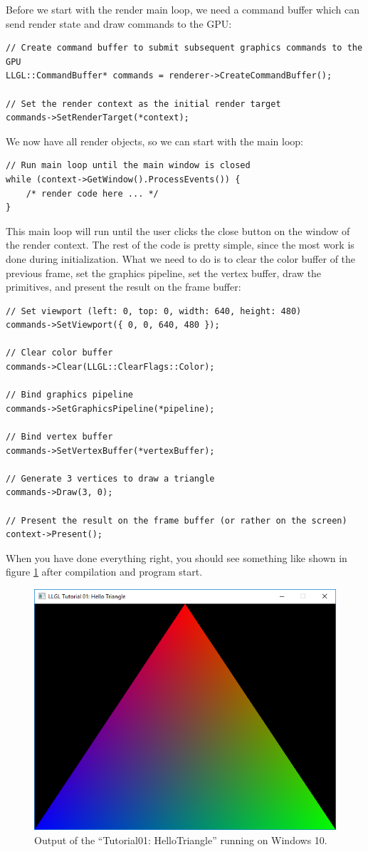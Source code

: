 \documentclass{article}
\begin{document}
Before we start with the render main loop, we need a command buffer which can send render state and draw commands to the GPU:
\begin{lstlisting}
// Create command buffer to submit subsequent graphics commands to the GPU
LLGL::CommandBuffer* commands = renderer->CreateCommandBuffer();

// Set the render context as the initial render target
commands->SetRenderTarget(*context);
\end{lstlisting}
We now have all render objects, so we can start with the main loop:
\begin{lstlisting}
// Run main loop until the main window is closed
while (context->GetWindow().ProcessEvents()) {
    /* render code here ... */
}
\end{lstlisting}
This main loop will run until the user clicks the close button on the window of the render context.
The rest of the code is pretty simple, since the most work is done during initialization.
What we need to do is to clear the color buffer of the previous frame,
set the graphics pipeline, set the vertex buffer, draw the primitives, and present the result on the frame buffer:
\begin{lstlisting}
// Set viewport (left: 0, top: 0, width: 640, height: 480)
commands->SetViewport({ 0, 0, 640, 480 });

// Clear color buffer
commands->Clear(LLGL::ClearFlags::Color);

// Bind graphics pipeline
commands->SetGraphicsPipeline(*pipeline);

// Bind vertex buffer
commands->SetVertexBuffer(*vertexBuffer);

// Generate 3 vertices to draw a triangle
commands->Draw(3, 0);

// Present the result on the frame buffer (or rather on the screen)
context->Present();
\end{lstlisting}
When you have done everything right, you should see something like shown in figure \ref{fig:tut01_mask1} after compilation
and program start.
\begin{figure}[H]
	\centering
	\includegraphics[width=0.8 \textwidth]{tut01_mask1a}
	\caption{Output of the ``Tutorial01: HelloTriangle'' running on Windows 10.}
	\label{fig:tut01_mask1}
\end{figure}
\end{document}
